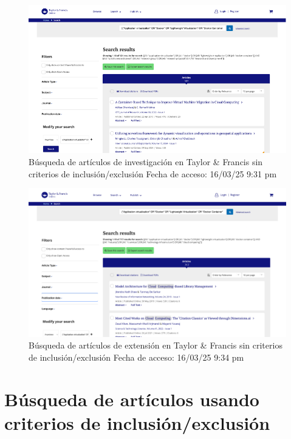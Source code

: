 \FloatBarrier\begin{figure}[H]
    \centering
    \includegraphics[width=\textwidth,keepaspectratio]{apendices/BD/sin-criterios/TF-inv.png}
    \caption{Búsqueda de artículos de investigación en Taylor \& Francis sin criterios de inclusión/exclusión
    Fecha de acceso: 16/03/25 9:31 pm
    }\label{fig:busqueda14}
\end{figure}
\FloatBarrier\begin{figure}[H]
    \centering
    \includegraphics[width=\textwidth,keepaspectratio]{apendices/BD/sin-criterios/TF-ind.png}
    \caption{Búsqueda de artículos de extensión en Taylor \& Francis sin criterios de inclusión/exclusión
    Fecha de acceso: 16/03/25 9:34 pm
    }\label{fig:busqueda15}
\end{figure}
\FloatBarrier\section{Búsqueda de artículos usando criterios de inclusión/exclusión}
